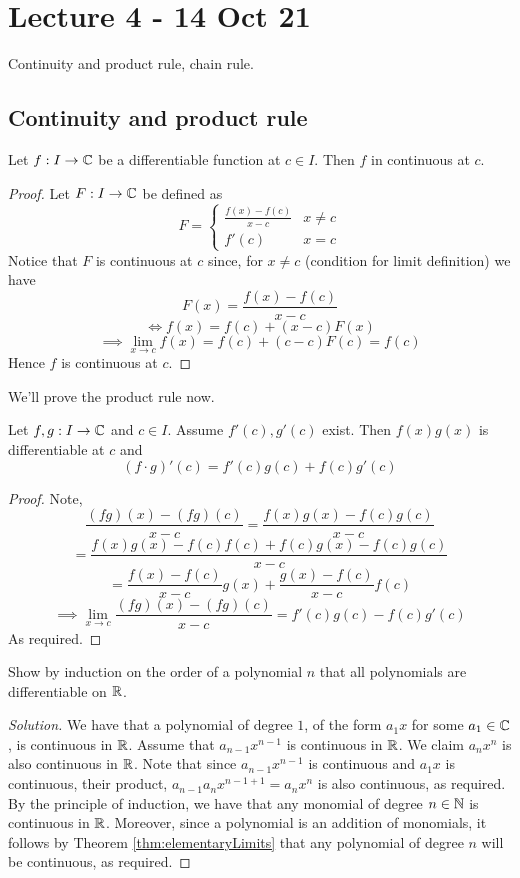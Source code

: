 \section{Lecture 4 - 14 Oct 21}
Continuity and product rule, chain rule.
\subsection{Continuity and product rule}
\begin{proposition}
  Let $f:I\to\mathbb C$ be a differentiable function at $c\in I$. Then $f$ in continuous at $c$.
  \label{prop:trivialDiff}
\end{proposition}
\begin{proof}
  Let $F:I\to\mathbb C$ be defined as 
  \[F=
    \begin{cases}
      \frac{f(x)-f(c)}{x-c} & x\neq c \\
      f'(c) & x=c
    \end{cases}\]
    Notice that $F$ is continuous at $c$ since, for $x\neq c$ (condition for limit
    definition) we have
    \[F(x)=\frac{f(x)-f(c)}{x-c}\]
    \[\iff f(x)=f(c)+(x-c)F(x)\]
    \[\implies \lim_{x\to c}f(x)= f(c)+ (c-c)F(c)=f(c)\]
    Hence $f$ is continuous at $c$.
\end{proof}

We'll prove the product rule now.
\begin{proposition}
  Let $f,g:I\to\mathbb C$ and $c\in I$. Assume $f'(c),g'(c)$ exist. Then $f(x)g(x)$ is
  differentiable at $c$ and 
  \[(f\cdot g)'(c)= f'(c)g(c) + f(c)g'(c)\]
  \label{prop:productRule}
\end{proposition}
\begin{proof}
  Note,
  \[\frac{(fg)(x)-(fg)(c)}{x-c} = \frac{f(x)g(x) - f(c)g(c)}{x-c}\]
  \[=\frac{f(x)g(x)-f(c)f(c) + f(c)g(x)-f(c)g(c)}{x-c}\]
  \[=\frac{f(x)-f(c)}{x-c}g(x) + \frac{g(x)-f(c)}{x-c}f(c)\]
  \[\implies \lim_{x\to c}\frac{(fg)(x)-(fg)(c)}{x-c}=f'(c)g(c)-f(c)g'(c) \]
  As required.
\end{proof}

\begin{exercise}
  Show by induction on the order of a polynomial $n$ that all polynomials are
  differentiable on $\mathbb R$.
\end{exercise}
\begin{proof}[Solution]
  We have that a polynomial of degree $1$, of the form $a_1x$ for some $a_1\in\mathbb C$, is
  continuous in $\mathbb R$. Assume that $a_{n-1}x^{n-1}$ is continuous in $\mathbb R$. We claim
  $a_nx^n$ is also continuous in $\mathbb R$. Note that since $a_{n-1}x^{n-1}$ is continuous and
  $a_1x$ is continuous, their product, $a_{n-1}a_n x^{n-1+1}=a_nx^n$ is also continuous,
  as required. By the principle of induction, we have that any monomial of degree
  $n\in\mathbb N$ is continuous in $\mathbb R$. Moreover, since a polynomial is an addition of
  monomials, it follows by Theorem \ref{thm:elementaryLimits} that any polynomial of
  degree $n$ will be continuous, as required.
\end{proof}


